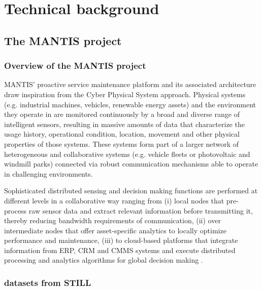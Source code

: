 \chapter{Technical background}
	\section{The MANTIS project}
		\subsection{Overview of the MANTIS project}
MANTIS' proactive service maintenance platform and its associated architecture draw inspiration from the Cyber Physical System approach. Physical systems (e.g. industrial machines, vehicles, renewable energy assets) and the environment they operate in are monitored continuously by a broad and diverse range of intelligent sensors, resulting in massive amounts of data that characterize the usage history, operational condition, location, movement and other physical properties of those systems. These systems form part of a larger network of heterogeneous and collaborative systems (e.g. vehicle fleets or photovoltaic and windmill parks) connected via robust communication mechanisms able to operate in challenging environments.

Sophisticated distributed sensing and decision making functions are performed at different levels in a collaborative way ranging from (i) local nodes that pre-process raw sensor data and extract relevant information before transmitting it, thereby reducing bandwidth requirements of communication, (ii) over intermediate nodes that offer asset-specific analytics to locally optimize performance and maintenance, (iii) to cloud-based platforms that integrate information from ERP, CRM and CMMS systems and execute distributed processing and analytics algorithms for global decision making \cite{Mantis}.

		\subsection{datasets from STILL}
